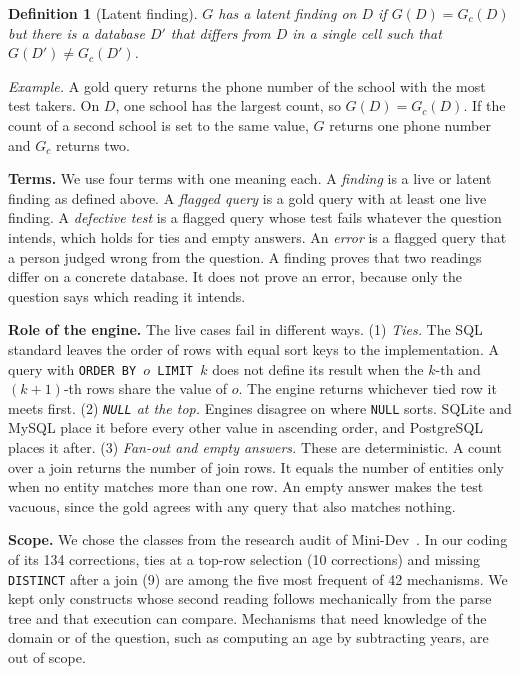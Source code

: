 \documentclass[conference]{IEEEtran}
\newtheorem{definition}{Definition}
\begin{document}
\begin{definition}[Latent finding]
$G$ has a latent finding on $D$ if $G(D) = G_c(D)$ but there is a database $D'$
that differs from $D$ in a single cell such that $G(D') \neq G_c(D')$.
\end{definition}

\emph{Example.} A gold query returns the phone number of the school with the
most test takers. On $D$, one school has the largest count, so $G(D) = G_c(D)$.
If the count of a second school is set to the same value, $G$ returns one phone
number and $G_c$ returns two.

\textbf{Terms.} We use four terms with one meaning each. A \emph{finding} is a
live or latent finding as defined above. A \emph{flagged query} is a gold query
with at least one live finding. A \emph{defective test} is a flagged query whose
test fails whatever the question intends, which holds for ties and empty
answers. An \emph{error} is a flagged query that a person judged wrong from the
question. A finding proves that two readings differ on a concrete database. It
does not prove an error, because only the question says which reading it
intends.

\textbf{Role of the engine.} The live cases fail in different ways. (1)
\emph{Ties.} The SQL standard leaves the order of rows with equal sort keys to
the implementation. A query with \texttt{ORDER BY $o$ LIMIT $k$} does not define
its result when the $k$-th and $(k{+}1)$-th rows share the value of $o$. The
engine returns whichever tied row it meets first. (2) \emph{\texttt{NULL} at the
top.} Engines disagree on where \texttt{NULL} sorts. SQLite and MySQL place it
before every other value in ascending order, and PostgreSQL places it after. (3)
\emph{Fan-out and empty answers.} These are deterministic. A count over a join
returns the number of join rows. It equals the number of entities only when no
entity matches more than one row. An empty answer makes the test vacuous, since
the gold agrees with any query that also matches nothing.

\textbf{Scope.} We chose the classes from the research audit of
Mini-Dev~\cite{jin2026pervasive}. In our coding of its 134 corrections, ties at
a top-row selection (10 corrections) and missing \texttt{DISTINCT} after a join
(9) are among the five most frequent of 42 mechanisms. We kept only constructs
whose second reading follows mechanically from the parse tree and that execution
can compare. Mechanisms that need knowledge of the domain or of the question,
such as computing an age by subtracting years, are out of scope.
\end{document}
